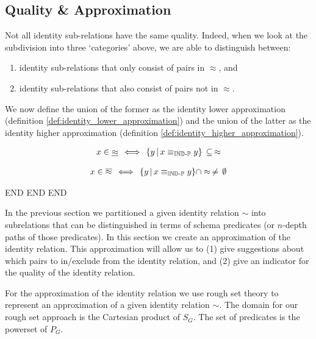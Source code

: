 \subsection{Quality \& Approximation}
\label{sec:approximation}

Not all identity sub-relations have the same quality.
Indeed, when we look at the subdivision into three `categories' above,
  we are able to distinguish between:
  \begin{enumerate}
  \item identity sub-relations that only consist of pairs in $\approx$, and
  \item identity sub-relations that also consist of pairs not in $\approx$.
  \end{enumerate}
\noindent We now define the union of the former as
  the identity lower approximation
  (definition \ref{def:identity_lower_approximation})
  and the union of the latter as
  the identity higher approximation
  (definition \ref{def:identity_higher_approximation}).

\begin{definition}
\label{def:identity_lower_approximation}
\begin{align}
  x \in \underline{\approx}
\, \iff \,
    \{y\,\vert\,x \equiv_{\operatorname{{\mathbb{IND}-\mathbb{P}}}} y\}
  \, \subseteq \,
    \approx
\end{align}
\end{definition}

\begin{definition}
\label{def:identity_higher_approximation}
\begin{align}
  x \in \overline{\approx}
\, \iff \,
      \{y\,\vert\,x \equiv_{\operatorname{{\mathbb{IND}-\mathbb{P}}}} y\}
    \cap
      \approx
  \, \neq \,
    \emptyset
\end{align}
\end{definition}

END END END

In the previous section we partitioned a given identity relation $\sim$
  into subrelations that can be distinguished in terms of schema predicates
  (or $n$-depth paths of those predicates).
In this section we create an approximation of the identity relation.
This approximation will allow us to
  (1) give suggestions about which pairs to in/exclude from
      the identity relation, and
  (2) give an indicator for the quality of the identity relation.

For the approximation of the identity relation we use
  rough set theory \cite{pawlak_1991} to represent an approximation of
  a given identity relation $\sim$.
The domain for our rough set approach is the Cartesian product of $S_G$.
The set of predicates is the powerset of $P_G$.

